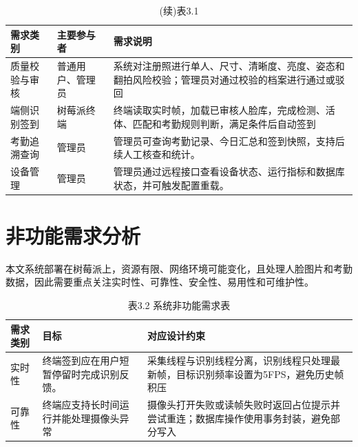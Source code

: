 \documentclass[UTF8]{heuthesis}
\begin{document}
\begingroup
\small
\begin{longtable}{|>{\raggedright\arraybackslash}p{}|>{\raggedright\arraybackslash}p{}|>{\raggedright\arraybackslash}p{}|}
\caption{(续)表3.1}\\
\hline
需求类别 & 主要参与者 & 需求说明 \\
\hline
质量校验与审核 & 普通用户、管理员 & 系统对注册照进行单人、尺寸、清晰度、亮度、姿态和翻拍风险校验；管理员对通过校验的档案进行通过或驳回 \\
\hline
端侧识别签到 & 树莓派终端 & 终端读取实时帧，加载已审核人脸库，完成检测、活体、匹配和考勤规则判断，满足条件后自动签到 \\
\hline
考勤追溯查询 & 管理员 & 管理员可查询考勤记录、今日汇总和签到快照，支持后续人工核查和统计。 \\
\hline
设备管理 & 管理员 & 管理员通过远程接口查看设备状态、运行指标和数据库状态，并可触发配置重载。 \\
\hline
\end{longtable}
\endgroup

\section{非功能需求分析}
本文系统部署在树莓派上，资源有限、网络环境可能变化，且处理人脸图片和考勤数据，因此需要重点关注实时性、可靠性、安全性、易用性和可维护性。

\begingroup
\small
\begin{longtable}{|>{\raggedright\arraybackslash}p{}|>{\raggedright\arraybackslash}p{}|>{\raggedright\arraybackslash}p{}|}
\caption{表3.2 系统非功能需求表}\\
\hline
需求类别 & 目标 & 对应设计约束 \\
\hline
实时性 & 终端签到应在用户短暂停留时完成识别反馈。 & 采集线程与识别线程分离，识别线程只处理最新帧，目标识别频率设置为5FPS，避免历史帧积压 \\
\hline
可靠性 & 终端应支持长时间运行并能处理摄像头异常 & 摄像头打开失败或读帧失败时返回占位提示并尝试重连；数据库操作使用事务封装，避免部分写入 \\
\hline
\end{longtable}
\endgroup
\end{document}
